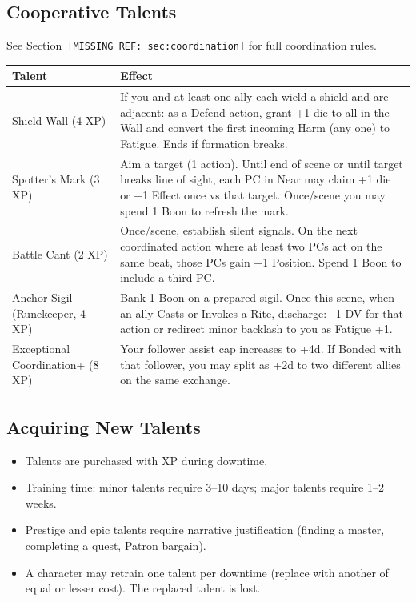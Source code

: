 \subsection{Cooperative Talents}

See Section~\texttt{[MISSING REF: sec:coordination]} for full coordination rules.

\begin{tabular}{@{}lp{10cm}@{}}
\toprule
\textbf{Talent} & \textbf{Effect} \\
\midrule
Shield Wall (4 XP) & If you and at least one ally each wield a shield and are adjacent: as a Defend action, grant +1 die to all in the Wall and convert the first incoming Harm (any one) to Fatigue. Ends if formation breaks. \\
Spotter's Mark (3 XP) & Aim a target (1 action). Until end of scene or until target breaks line of sight, each PC in Near may claim +1 die or +1 Effect once vs that target. Once/scene you may spend 1 Boon to refresh the mark. \\
Battle Cant (2 XP) & Once/scene, establish silent signals. On the next coordinated action where at least two PCs act on the same beat, those PCs gain +1 Position. Spend 1 Boon to include a third PC. \\
Anchor Sigil (Runekeeper, 4 XP) & Bank 1 Boon on a prepared sigil. Once this scene, when an ally Casts or Invokes a Rite, discharge: --1 DV for that action or redirect minor backlash to you as Fatigue +1. \\
Exceptional Coordination+ (8 XP) & Your follower assist cap increases to +4d. If Bonded with that follower, you may split as +2d to two different allies on the same exchange. \\
\bottomrule
\end{tabular}

\subsection{Acquiring New Talents}

\begin{itemize}
  \item Talents are purchased with XP during downtime.
  \item Training time: minor talents require 3--10 days; major talents require 1--2 weeks.
  \item Prestige and epic talents require narrative justification (finding a master, completing a quest, Patron bargain).
  \item A character may retrain one talent per downtime (replace with another of equal or lesser cost). The replaced talent is lost.
\end{itemize}
